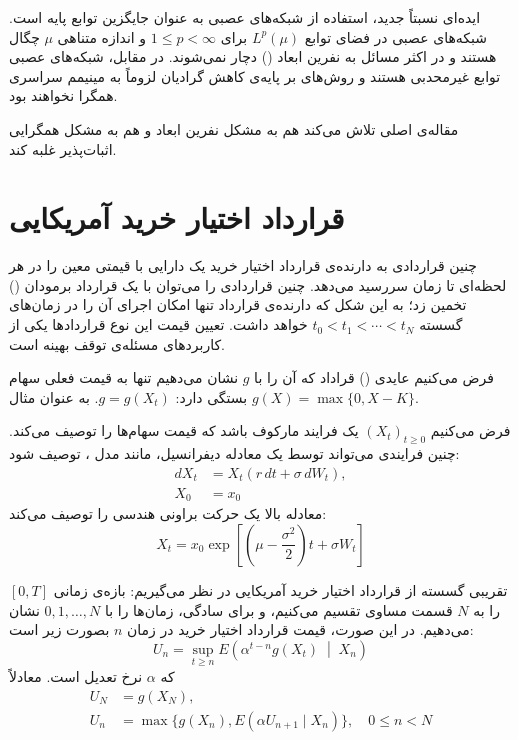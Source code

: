 \documentclass[hidelinks, 11pt]{article}
\begin{document}
ایده‌ای نسبتاً جدید، استفاده از شبکه‌های عصبی به عنوان جایگزین توابع پایه
است.  شبکه‌های عصبی در فضای توابع \(L^{p}(\mu)\) برای \(1\leq p<\infty\)
و اندازه متناهی \(\mu\) چگال هستند و در اکثر مسائل به نفرین ابعاد
() دچار نمی‌شوند.  در مقابل، شبکه‌های عصبی
توابع غیرمحدبی هستند و روش‌های بر پایه‌ی کاهش گرادیان لزوماً به مینیمم
سراسری همگرا نخواهند بود.

مقاله‌ی اصلی تلاش می‌کند هم به مشکل نفرین ابعاد و هم به مشکل همگرایی
اثبات‌پذیر غلبه کند.

\section{قرارداد اختیار خرید آمریکایی}
\label{sec:org9685929}

چنین قراردادی به دارنده‌ی قرارداد اختیار خرید یک دارایی با قیمتی معین را
در هر لحظه‌ای تا زمان سررسید می‌دهد.  چنین قراردادی را می‌توان با یک
قرارداد برمودان () تخمین زد؛ به این شکل که دارنده‌ی
قرارداد تنها امکان اجرای آن را در زمان‌های گسسته \(t_0<t_1<\cdots<t_N\)
خواهد داشت.  تعیین قیمت این نوع قراردادها یکی از کاربردهای مسئله‌ی توقف
بهینه است.

فرض می‌کنیم عایدی () قراداد که آن را با \(g\) نشان می‌دهیم تنها
به قیمت فعلی سهام بستگی دارد: \(g=g(X_{t})\).  به عنوان مثال
\(g(X)=\max\{0,X-K\}\).

فرض می‌کنیم \((X_{t})_{t\geq 0}\) یک فرایند مارکوف باشد که قیمت سهام‌ها را
توصیف می‌کند.  چنین فرایندی می‌تواند توسط یک معادله دیفرانسیل، مانند
مدل ، توصیف شود:
\begin{align*}
	dX_{t} & = X_{t} (r\, dt + \sigma \,dW_{t}), \\
	X_{0}  & = x_{0}
\end{align*}
معادله بالا یک حرکت براونی هندسی را توصیف می‌کند:
\begin{equation*}
  X_{t} = x_{0} \exp \left[ \left(\mu-\frac{\sigma^{2}}{2}\right)t
    + \sigma W_{t} \right]
\end{equation*}

تقریبی گسسته از قرارداد اختیار خرید آمریکایی در نظر می‌گیریم: بازه‌ی زمانی
\([0,T]\) را به \(N\) قسمت مساوی تقسیم می‌کنیم، و برای سادگی، زمان‌ها را
با \(0,1,\dots,N\) نشان می‌دهیم.  در این صورت، قیمت قرارداد اختیار خرید
در زمان \(n\) بصورت زیر است:
\begin{equation*}
	U_{n} = \sup_{t\geq n} E\left(\alpha^{t-n} g(X_{t}) \;\middle|\; X_{n}\right)
\end{equation*}
که \(\alpha\) نرخ تعدیل است.  معادلاً
\begin{equation}
  \label{U:price}
  \begin{split}
	U_{N} & = g(X_{N}), \\
	U_{n} & =
	  \max \big\{ g(X_{n}), E(\alpha U_{n+1} \mid X_{n}) \big\},
	    \quad  0\leq n < N
  \end{split}
\end{equation}
\end{document}
